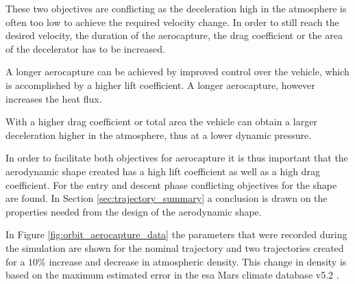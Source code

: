 These two objectives are conflicting as the deceleration high in the atmosphere is often too low to achieve the required velocity change. In order to still reach the desired velocity, the duration of the aerocapture, the drag coefficient or the area of the decelerator has to be increased. 

A longer aerocapture can be achieved by improved control over the vehicle, which is accomplished by a higher lift coefficient. A longer aerocapture, however increases the heat flux.

With a higher drag coefficient or total area the vehicle can obtain a larger deceleration higher in the atmosphere, thus at a lower dynamic pressure.

In order to facilitate both objectives for aerocapture it is thus important that the aerodynamic shape created has a high lift coefficient as well as a high drag coefficient. For the entry and descent phase conflicting objectives for the shape are found. In Section \ref{sec:trajectory_summary} a conclusion is drawn on the properties needed from the design of the aerodynamic shape.

In Figure \ref{fig:orbit_aerocapture_data} the parameters that were recorded during the simulation are shown for the nominal trajectory and two trajectories created for a $10\%$ increase and decrease in atmospheric density. This change in density is based on the maximum estimated error in the \gls{esa} Mars climate database v5.2 \cite{Lewis2015}.

